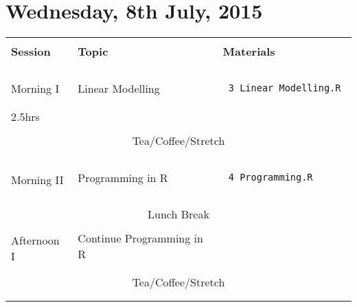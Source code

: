 \documentclass{article}[12pt]
\begin{document}
\section*{Wednesday, 8th July, 2015}
\begin{table}[h!]
\begin{tabular}{ |p{2cm}|p{4cm}|p{7cm}| }
\hline
                               &                              & \\
\textbf{Session}               & \textbf{Topic}               & \textbf{Materials} \\ 
                               &                              & \\ \hline \hline
 & & \\
Morning I                   & Linear Modelling             & \begin{verbatim} 3_Linear_Modelling.R \end{verbatim} \\ %
2.5hrs                         &                              &  \\ \hline
\multicolumn{3}{c}{} \\ 
\multicolumn{3}{c}{Tea/Coffee/Stretch}  \\ 
\multicolumn{3}{c}{} \\ \hline
 & & \\
\multirow{2}{*}{Morning II}    & Programming in R            & \begin{verbatim} 4_Programming.R \end{verbatim} \\
                               &                             &  \\ \hline
\multicolumn{3}{c}{} \\ 
\multicolumn{3}{c}{Lunch Break}  \\ 
\multicolumn{3}{c}{} \\ \hline
\multirow{2}{*}{Afternoon I}  & Continue Programming in R            &  \\
                              &     &  \\ \hline
\multicolumn{3}{c}{} \\
\multicolumn{3}{c}{Tea/Coffee/Stretch}  \\ 
\multicolumn{3}{c}{} \\ \hline
 & & \\

\end{tabular}
\end{table}
\end{document}

